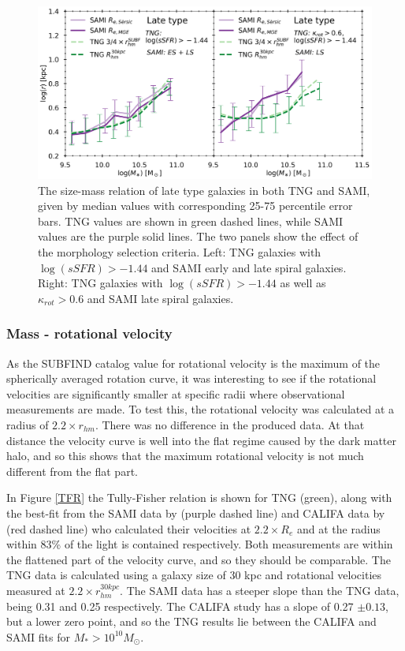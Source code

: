 \begin{figure}
    \centering
    \includegraphics[width=\textwidth]{images/SM_R_lates.png}
    \caption{The size-mass relation of late type galaxies in both TNG and SAMI, given by median values with corresponding 25-75 percentile error bars. TNG values are shown in green dashed lines, while SAMI values are the purple solid lines. The two panels show the effect of the morphology selection criteria. Left: TNG galaxies with $\log(sSFR) > -1.44$ and SAMI early and late spiral galaxies. Right: TNG galaxies with $\log(sSFR) > -1.44$ as well as $\kappa_{rot} > 0.6$ and SAMI late spiral galaxies.}
    \label{SM_R_lates}
\end{figure}

\subsubsection{Mass - rotational velocity}
As the SUBFIND catalog value for rotational velocity is the maximum of the spherically averaged rotation curve, it was interesting to see if the rotational velocities are significantly smaller at specific radii where observational measurements are made. To test this, the rotational velocity was calculated at a radius of $2.2 \times r_{hm}$. There was no difference in the produced data. At that distance the velocity curve is well into the flat regime caused by the dark matter halo, and so this shows that the maximum rotational velocity is not much different from the flat part.

In Figure \ref{TFR} the Tully-Fisher relation is shown for TNG (green), along with the best-fit from the SAMI data by \textcite{Bloom2017} (purple dashed line) and CALIFA data by \textcite{Bekerait2016} (red dashed line) who calculated their velocities at $2.2 \times R_e$ and at the radius within 83\% of the light is contained respectively. Both measurements are within the flattened part of the velocity curve, and so they should be comparable. The TNG data is calculated using a galaxy size of 30 kpc and rotational velocities measured at $2.2 \times r_{hm}^{30kpc}$. The SAMI data has a steeper slope than the TNG data, being 0.31 and 0.25 respectively. The CALIFA study has a slope of 0.27 $\pm 0.13$, but a lower zero point, and so the TNG results lie between the CALIFA and SAMI fits for $M_\ast > 10^{10}M_{\odot}$. 


